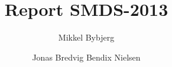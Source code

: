 \documentclass[]{report}
\title{Report SMDS-2013}
\author{Mikkel Bybjerg}
\author{Jonas Bredvig Bendix Nielsen}
\begin{document}
\maketitle

\begin{abstract}
\end{abstract}
\end{document}
